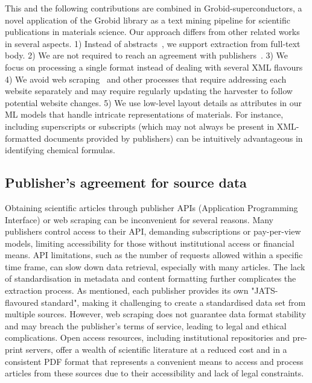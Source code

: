 This and the following contributions are combined in Grobid-superconductors, a novel application of the Grobid library as a text mining pipeline for scientific publications in materials science.
Our approach differs from other related works in several aspects. 
1) Instead of abstracts~\cite{mitsui2023automatic}, we support extraction from full-text body.
2) We are not required to reach an agreement with publishers~\cite{kononova2019text}.
3) We focus on processing a single format instead of dealing with several XML flavours~\cite{kononova2019text}
4) We avoid web scraping~\cite{court2020magnetic} and other processes that require addressing each website separately and may require regularly updating the harvester to follow potential website changes.
5) We use low-level layout details as attributes in our ML models that handle intricate representations of materials. For instance, including superscripts or subscripts (which may not always be present in XML-formatted documents provided by publishers) can be intuitively advantageous in identifying chemical formulas.

\subsection{Publisher's agreement for source data}
Obtaining scientific articles through publisher APIs (Application Programming Interface) or web scraping can be inconvenient for several reasons. 
Many publishers control access to their API, demanding subscriptions or pay-per-view models, limiting accessibility for those without institutional access or financial means. 
API limitations, such as the number of requests allowed within a specific time frame, can slow down data retrieval, especially with many articles. The lack of standardisation in metadata and content formatting further complicates the extraction process.
As mentioned, each publisher provides its own "JATS-flavoured standard", making it challenging to create a standardised data set from multiple sources. 
However, web scraping does not guarantee data format stability and may breach the publisher's terms of service, leading to legal and ethical complications.
Open access resources, including institutional repositories and pre-print servers, offer a wealth of scientific literature at a reduced cost and in a consistent PDF format that represents a convenient means to access and process articles from these sources due to their accessibility and lack of legal constraints.

